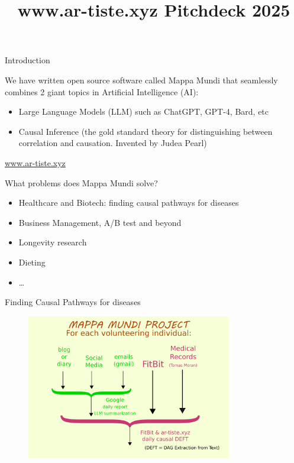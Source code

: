 \documentclass{beamer}
\title{www.ar-tiste.xyz  Pitchdeck 2025}
\begin{document}
\begin{frame}
\maketitle

\end{frame}\begin{frame}{Introduction}

We have written open source software called Mappa Mundi that seamlessly combines 2 giant topics in Artificial Intelligence (AI):
\begin{itemize}
    \item Large Language Models (LLM) such as ChatGPT, GPT-4, Bard, etc
    \item Causal Inference (the gold standard theory for distinguishing between correlation and causation. Invented by Judea Pearl)
\end{itemize}

\url{www.ar-tiste.xyz}

\end{frame}\begin{frame}{What problems does Mappa Mundi solve?}

\begin{itemize}
    \item Healthcare and Biotech: finding causal pathways for diseases
    \item Business Management, A/B test and beyond
    \item Longevity research
    \item Dieting
    \item \ldots
\end{itemize}

\end{frame}\begin{frame}{Finding Causal Pathways for diseases}

\begin{figure}
   \centering
    \includegraphics[width=0.8\textwidth]
    {fitbit-artiste.png}


\end{figure}
\end{frame}
\end{document}
